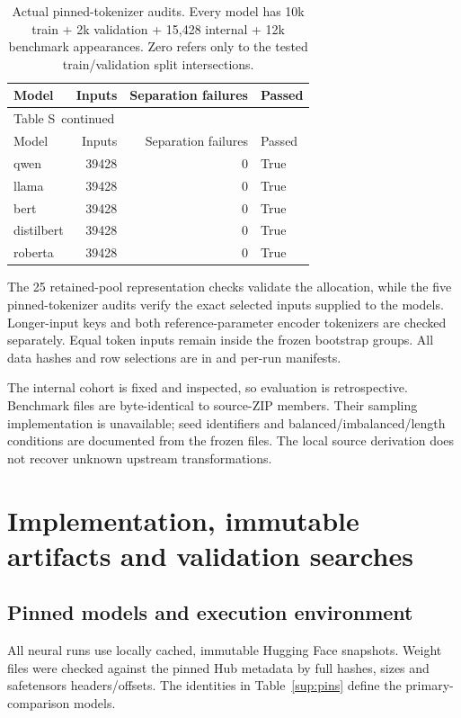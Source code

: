 \documentclass[10pt,a4paper]{article}
\renewcommand{\thetable}{S\arabic{table}}
\begin{document}
{\small
\setlength{\tabcolsep}{4pt}
\begin{longtable}{@{}lrrl@{}}
\caption{Actual pinned-tokenizer audits. Every model has 10k train + 2k validation + 15,428 internal + 12k benchmark appearances. Zero refers only to the tested train/validation split intersections.}\label{sup:audits}\\
\toprule
Model & Inputs & Separation failures & Passed \\
\midrule\endfirsthead
\multicolumn{4}{l}{\small Table \thetable\ continued}\\
\toprule
Model & Inputs & Separation failures & Passed \\
\midrule\endhead
\bottomrule\endfoot
qwen & 39428 & 0 & True \\
llama & 39428 & 0 & True \\
bert & 39428 & 0 & True \\
distilbert & 39428 & 0 & True \\
roberta & 39428 & 0 & True \\
\end{longtable}
}


The 25 retained-pool representation checks validate the allocation, while the five pinned-tokenizer audits verify the exact selected inputs supplied to the models. Longer-input keys and both reference-parameter encoder tokenizers are checked separately. Equal token inputs remain inside the frozen bootstrap groups. All data hashes and row selections are in  and per-run manifests.

The internal cohort is fixed and inspected, so evaluation is retrospective. Benchmark files are byte-identical to source-ZIP members. Their sampling implementation is unavailable; seed identifiers and balanced/imbalanced/length conditions are documented from the frozen files. The local source derivation does not recover unknown upstream transformations.


\section{Implementation, immutable artifacts and validation searches}\label{sup:implementation}


\subsection{Pinned models and execution environment}
All neural runs use locally cached, immutable Hugging Face snapshots. Weight files were checked against the pinned Hub metadata by full hashes, sizes and safetensors headers/offsets. The identities in Table~\ref{sup:pins} define the primary-comparison models.
\end{document}
